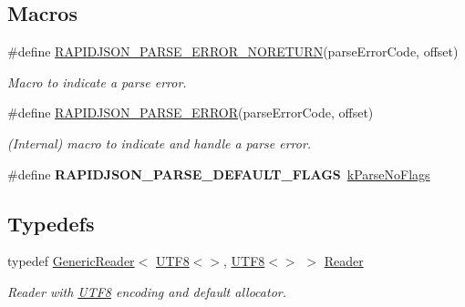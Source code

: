 \subsection*{Macros}
\begin{DoxyCompactItemize}
\item 
\#define \hyperlink{a00832_ga7f8c4265b2edda78568ae3338aaf1461}{R\+A\+P\+I\+D\+J\+S\+O\+N\+\_\+\+P\+A\+R\+S\+E\+\_\+\+E\+R\+R\+O\+R\+\_\+\+N\+O\+R\+E\+T\+U\+RN}(parse\+Error\+Code,  offset)
\begin{DoxyCompactList}\small\item\em Macro to indicate a parse error. \end{DoxyCompactList}\item 
\#define \hyperlink{a00832_gae3689840fa6e89a241313f33b602f865}{R\+A\+P\+I\+D\+J\+S\+O\+N\+\_\+\+P\+A\+R\+S\+E\+\_\+\+E\+R\+R\+OR}(parse\+Error\+Code,  offset)
\begin{DoxyCompactList}\small\item\em (Internal) macro to indicate and handle a parse error. \end{DoxyCompactList}\item 
\#define {\bfseries R\+A\+P\+I\+D\+J\+S\+O\+N\+\_\+\+P\+A\+R\+S\+E\+\_\+\+D\+E\+F\+A\+U\+L\+T\+\_\+\+F\+L\+A\+GS}~\hyperlink{a00683_ab7be7dabe6ffcba60fad441505583450a1af603dc5f65bb815316589e782bc71a}{k\+Parse\+No\+Flags}\hypertarget{a00683_a77005e892e6601599beaf421b0395c31}{}\label{a00683_a77005e892e6601599beaf421b0395c31}

\end{DoxyCompactItemize}
\subsection*{Typedefs}
\begin{DoxyCompactItemize}
\item 
typedef \hyperlink{a00122}{Generic\+Reader}$<$ \hyperlink{a00333}{U\+T\+F8}$<$$>$, \hyperlink{a00333}{U\+T\+F8}$<$$>$ $>$ \hyperlink{a00683_a84f3b66a66647f4ac4267078359188ba}{Reader}\hypertarget{a00683_a84f3b66a66647f4ac4267078359188ba}{}\label{a00683_a84f3b66a66647f4ac4267078359188ba}

\begin{DoxyCompactList}\small\item\em Reader with \hyperlink{a00333}{U\+T\+F8} encoding and default allocator. \end{DoxyCompactList}\end{DoxyCompactItemize}
